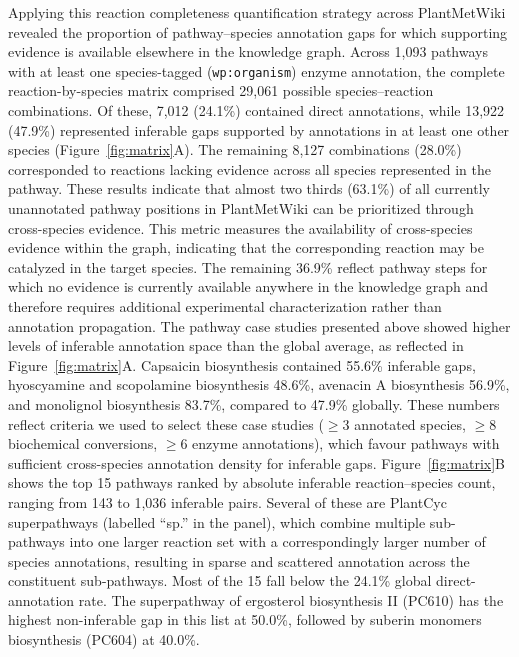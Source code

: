 \documentclass[11pt,a4paper]{article}
\begin{document}
Applying this reaction completeness quantification strategy across PlantMetWiki revealed the proportion
of pathway--species annotation gaps for which supporting evidence is available elsewhere in the
knowledge graph. Across 1,093 pathways with at least one species-tagged (\texttt{wp:organism}) enzyme
annotation, the complete reaction-by-species matrix comprised 29,061 possible species--reaction
combinations. Of these, 7,012 (24.1\%) contained direct annotations, while 13,922 (47.9\%) represented
inferable gaps supported by annotations in at least one other species (Figure~\ref{fig:matrix}A). The
remaining 8,127 combinations (28.0\%) corresponded to reactions lacking evidence across all species
represented in the pathway. These results indicate that almost two thirds
(63.1\%) of all currently unannotated pathway positions in PlantMetWiki can be prioritized through
cross-species evidence. This metric measures the availability of cross-species evidence within the
graph, indicating that the corresponding reaction may be catalyzed in the target species. The
remaining 36.9\% reflect pathway steps for which no
evidence is currently available anywhere in the knowledge graph and therefore requires additional
experimental characterization rather than annotation propagation. The pathway case studies presented
above showed higher levels of inferable annotation space than the global average, as
reflected in Figure~\ref{fig:matrix}A. Capsaicin biosynthesis contained 55.6\% inferable gaps,
hyoscyamine and scopolamine biosynthesis 48.6\%, avenacin A biosynthesis 56.9\%, and monolignol
biosynthesis 83.7\%, compared to 47.9\% globally. These numbers reflect criteria we used to
select these case studies ($\geq$3 annotated species, $\geq$8 biochemical conversions, $\geq$6
enzyme annotations), which favour pathways with sufficient cross-species annotation density for
inferable gaps. Figure~\ref{fig:matrix}B shows the top 15 pathways ranked by absolute inferable reaction--species count, ranging from 143 to 1,036 inferable pairs. Several of these are PlantCyc superpathways (labelled ``sp.'' in the panel), which combine multiple sub-pathways into one larger reaction set with a correspondingly larger number of species annotations, resulting in sparse and scattered annotation across the constituent sub-pathways. Most of the 15 fall below the 24.1\% global direct-annotation rate. The superpathway of ergosterol biosynthesis II (PC610) has the highest non-inferable gap in this list at 50.0\%, followed by suberin monomers biosynthesis (PC604) at 40.0\%.
\end{document}
